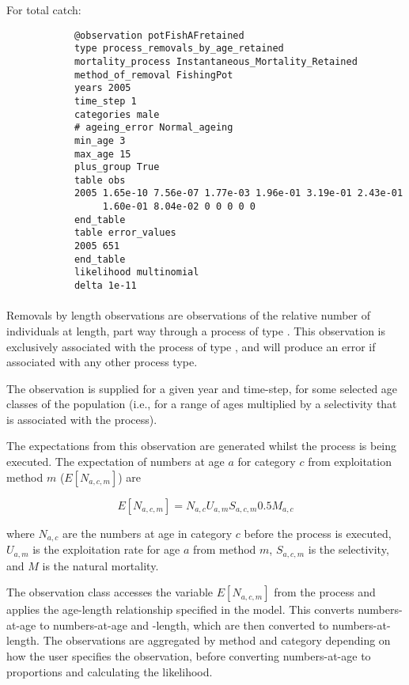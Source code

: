 \begin{itemize}
	For total catch:
	
	{\small{\begin{verbatim}
			@observation potFishAFretained
			type process_removals_by_age_retained
			mortality_process Instantaneous_Mortality_Retained
			method_of_removal FishingPot
			years 2005
			time_step 1
			categories male
			# ageing_error Normal_ageing
			min_age 3
			max_age 15
			plus_group True
			table obs
			2005 1.65e-10 7.56e-07 1.77e-03 1.96e-01 3.19e-01 2.43e-01 
			     1.60e-01 8.04e-02 0 0 0 0 0
			end_table
			table error_values
			2005 651
			end_table
			likelihood multinomial
			delta 1e-11
			\end{verbatim}}}
	
	\paragraph*{\label{sec:removals-by-length}}\label{sec:Observation-ProcessRemovalsByLength}
	
	Removals by length observations are observations of the relative number of individuals at length, part way through a process of type . This observation is exclusively associated with the process of type , and will produce an error if associated with any other process type.
	
	The observation is supplied for a given year and time-step, for some selected age classes of the population (i.e., for a range of ages multiplied by a selectivity that is associated with the process).
	
	The expectations from this observation are generated whilst the process is being executed. The expectation of numbers at age $a$ for category $c$ from exploitation method $m$ ($E[N_{a,c,m}]$) are
	
	\begin{equation}
	E[N_{a,c,m}] = N_{a,c} U_{a,m} S_{a,c,m} 0.5 M_{a,c}
	\end{equation}
	
	where $N_{a,c}$ are the numbers at age in category $c$ before the process is executed, $U_{a,m}$ is the exploitation rate for age $a$ from method $m$, $S_{a,c,m}$ is the selectivity, and $M$ is the natural mortality.
	
	The observation class accesses the variable $E[N_{a,c,m}]$ from the process and applies the age-length relationship specified in the model. This converts numbers-at-age to numbers-at-age and -length, which are then converted to numbers-at-length. The observations are aggregated by method and category depending on how the user specifies the observation, before converting numbers-at-age to proportions and calculating the likelihood.
	

\end{itemize}
